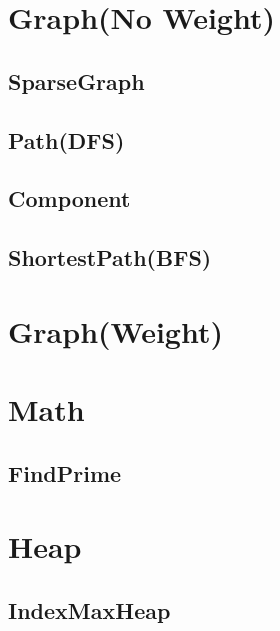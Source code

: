 \section{Graph(No Weight)}
    \subsection{SparseGraph}
        
    \subsection{Path(DFS)}
        
    \subsection{Component}
        
    \subsection{ShortestPath(BFS)}
        

\section{Graph(Weight)}

\section{Math}
    \subsection{FindPrime}
        

\section{Heap}
    \subsection{IndexMaxHeap}
        